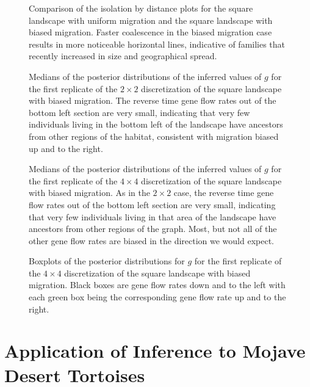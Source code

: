 \documentclass{article}
\begin{document}
\begin{figure}
\centering
\caption{Comparison of the isolation by distance plots for the square landscape with uniform migration
and the square landscape with biased migration.
Faster coalescence in the biased migration case results in more noticeable horizontal lines,
indicative of families that recently increased in size and geographical spread.}
\label{fig:ibd_comp}
\end{figure}


\begin{figure}
\centering
\caption{Medians of the posterior distributions of the inferred values of $g$ 
for the first replicate of the $2 \times 2$ discretization of the square landscape with biased migration.
The reverse time gene flow rates out of the bottom left section are very small,
indicating that very few individuals living in the bottom left of the landscape
have ancestors from other regions of the habitat,
consistent with migration biased up and to the right.}
\label{fig:2x2grid_asb}
\end{figure}

\begin{figure}
\centering
\caption{Medians of the posterior distributions of the inferred values of $g$ 
for the first replicate of the $4 \times 4$ discretization of the square landscape with biased migration.
As in the $2 \times 2$ case, 
the reverse time gene flow rates out of the bottom left section are very small,
indicating that very few individuals living in that area of the landscape
have ancestors from other regions of the graph.
Most, but not all of the other gene flow rates are biased 
in the direction we would expect.}
\label{fig:grid_bias_4x4_1}
\end{figure}

\begin{figure}
\centering
\caption{Boxplots of the posterior distributions for $g$ 
for the first replicate of the $4 \times 4$ discretization of the square landscape with biased migration.
Black boxes are gene flow rates down and to the left 
with each green box being the corresponding gene flow rate up and to the right.}
\label{fig:post_dists_bias_4x4_1}
\end{figure}

\section*{Application of Inference to Mojave Desert Tortoises}
\end{document}
